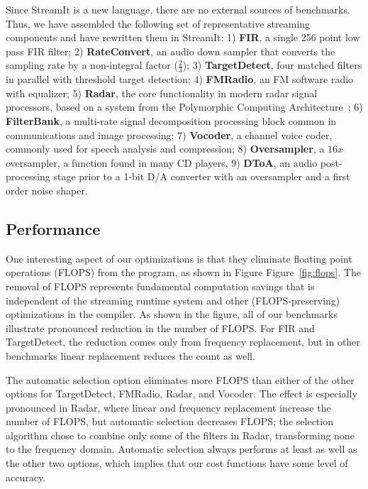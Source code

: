 Since StreamIt is a new language, there are no external sources of
benchmarks.  Thus, we have assembled the following set of
representative streaming components and have rewritten them in
StreamIt: 1) {\bf FIR}, a single 256 point low pass FIR filter; 2)
{\bf RateConvert}, an audio down sampler that converts the sampling
rate by a non-integral factor ($\frac{2}{3}$); 3) {\bf TargetDetect},
four matched filters in parallel with threshold target detection; 4)
{\bf FMRadio}, an FM software radio with equalizer; 5) {\bf Radar},
the core functionality in modern radar signal processors, based on a
system from the Polymorphic Computing Architecture~\cite{pca}; 6) {\bf
FilterBank}, a multi-rate signal decomposition processing block common
in communications and image processing; 7) {\bf Vocoder}, a channel
voice coder, commonly used for speech analysis and compression; 8)
{\bf Oversampler}, a $16x$ oversampler, a function found in many CD
players, 9) {\bf DToA}, an audio post-processing stage prior to a
1-bit D/A converter with an oversampler and a first order noise
shaper.

\subsection{Performance}

One interesting aspect of our optimizations is that they eliminate
floating point operations (FLOPS) from the program, as shown in Figure
Figure~\ref{fig:flops}.  The removal of FLOPS represents fundamental
computation savings that is independent of the streaming runtime
system and other (FLOPS-preserving) optimizations in the compiler.  As
shown in the figure, all of our benchmarks illustrate pronounced
reduction in the number of FLOPS.  For FIR and TargetDetect, the
reduction comes only from frequency replacement, but in other
benchmarks linear replacement reduces the count as well.  

The automatic selection option eliminates more FLOPS than either of
the other options for TargetDetect, FMRadio, Radar, and Vocoder.  The
effect is especially pronounced in Radar, where linear and frequency
replacement increase the number of FLOPS, but automatic selection
decreases FLOPS; the selection algorithm chose to combine only some of
the filters in Radar, transforming none to the frequency domain.
Automatic selection always performs at least as well as the other two
options, which implies that our cost functions have some level of
accuracy.

